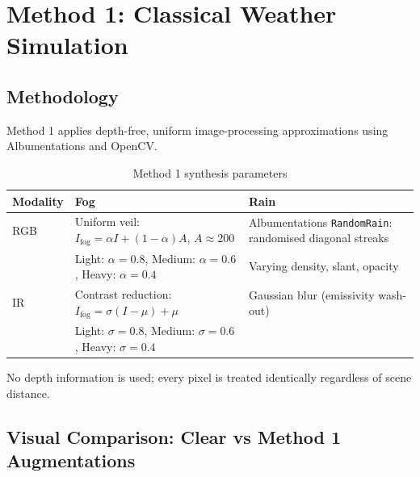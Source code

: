 \documentclass[11pt,a4paper]{article}
\begin{document}
\section{Method 1: Classical Weather Simulation}

\subsection{Methodology}

Method 1 applies depth-free, uniform image-processing approximations using Albumentations and OpenCV.

\begin{table}[H]
\centering
\caption{Method 1 synthesis parameters}
\label{tab:method1_params}
\begin{tabular}{lll}
\toprule
Modality & Fog & Rain \\
\midrule
RGB & Uniform veil: $I_{\text{fog}} = \alpha I + (1-\alpha)A$, $A \approx 200$ & Albumentations \texttt{RandomRain}: randomised diagonal streaks \\
& Light: $\alpha=0.8$, Medium: $\alpha=0.6$, Heavy: $\alpha=0.4$ & Varying density, slant, opacity \\
IR & Contrast reduction: $I_{\text{fog}} = \sigma(I - \mu) + \mu$ & Gaussian blur (emissivity wash-out) \\
& Light: $\sigma=0.8$, Medium: $\sigma=0.6$, Heavy: $\sigma=0.4$ & \\
\bottomrule
\end{tabular}
\end{table}

No depth information is used; every pixel is treated identically regardless of scene distance.

\subsection{Visual Comparison: Clear vs Method 1 Augmentations}
\end{document}

